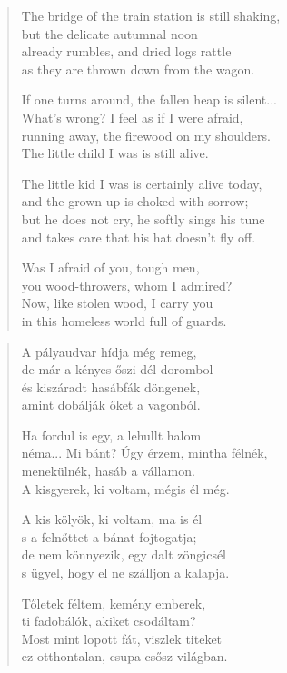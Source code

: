 \documentclass[11pt]{book}
\newcommand*{\centeredornament}{\centerline{\pgfornament[width=6cm]{88}}}
\begin{document}
\begin{verse}
  The bridge of the train station is still shaking,\hspace*{-1mm} \\
  but the delicate autumnal noon \\
  already rumbles, and dried logs rattle \\
  as they are thrown down from the wagon.

  If one turns around, the fallen heap is silent...\hspace*{-1mm} \\
  What's wrong? I feel as if I were afraid, \\
  running away, the firewood on my shoulders.\hspace*{-1mm} \\
  The little child I was is still alive.

  The little kid I was is certainly alive today, \\
  and the grown-up is choked with sorrow; \\
  but he does not cry, he softly sings his tune \\
  and takes care that his hat doesn't fly off.

  Was I afraid of you, tough men, \\
  you wood-throwers, whom I admired? \\
  Now, like stolen wood, I carry you \\
  in this homeless world full of guards.
\end{verse}

\newpage

\vspace*{-15mm}
\centeredornament



\begin{verse}
  A pályaudvar hídja még remeg, \\
  de már a kényes őszi dél dorombol \\
  és kiszáradt hasábfák döngenek, \\
  amint dobálják őket a vagonból.

  Ha fordul is egy, a lehullt halom \\
  néma... Mi bánt? Úgy érzem, mintha félnék, \\
  menekülnék, hasáb a vállamon. \\
  A kisgyerek, ki voltam, mégis él még.

  A kis kölyök, ki voltam, ma is él \\
  s a felnőttet a bánat fojtogatja; \\
  de nem könnyezik, egy dalt zöngicsél \\
  s ügyel, hogy el ne szálljon a kalapja.

  Tőletek féltem, kemény emberek, \\
  ti fadobálók, akiket csodáltam? \\
  Most mint lopott fát, viszlek titeket \\
  ez otthontalan, csupa-csősz világban.
\end{verse}
\end{document}
